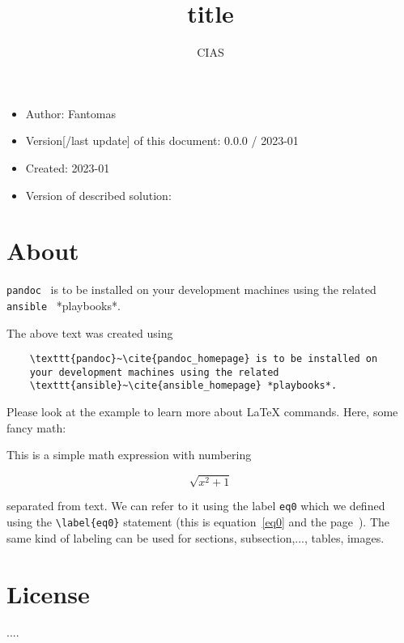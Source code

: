 \documentclass[a4paper]{article}
\begin{document}
\title{title}
\author{CIAS}
\maketitle

\tableofcontents

\begin{itemize}
    \item Author: Fantomas
    \item Version[/last update] of this document:  0.0.0 / 2023-01
    \item Created: 2023-01
    \item Version of described solution:
\end{itemize}

\section{About}



\texttt{pandoc}~\cite{pandoc_homepage} is to be installed on your development machines using the related \texttt{ansible}~\cite{ansible_homepage} *playbooks*.

\medskip

\noindent
The above text was created using
\begin{verbatim}
    \texttt{pandoc}~\cite{pandoc_homepage} is to be installed on
    your development machines using the related
    \texttt{ansible}~\cite{ansible_homepage} *playbooks*.
\end{verbatim}

\noindent
Please look at the example to learn more about \LaTeX{} commands. Here, some fancy math:

This is a simple math expression with numbering

\begin{equation}
    \sqrt{x^2+1}    \label{eq0}
\end{equation}

separated from text. We can refer to it using the label \texttt{eq0} which we defined using the \verb?\label{eq0}? statement (this is equation~\ref{eq0} and the page~\pageref{eq0}).
The same kind of labeling can be used for sections, subsection,..., tables, images.


\section{License}
....
\appendix
\end{document}
